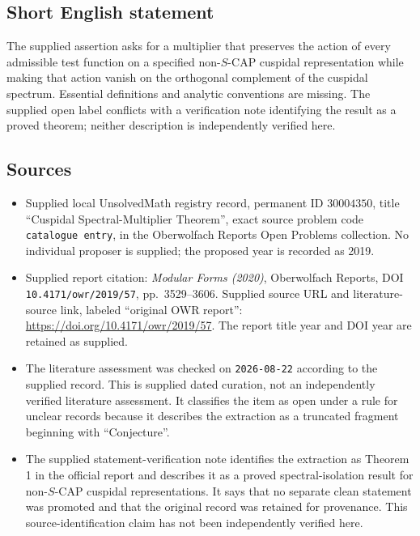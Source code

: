 \documentclass[11pt]{article}
\begin{document}
\subsection{Short English statement}
The supplied assertion asks for a multiplier that preserves the action of every admissible test function on a specified non-\(S\)-CAP cuspidal representation while making that action vanish on the orthogonal complement of the cuspidal spectrum. Essential definitions and analytic conventions are missing. The supplied open label conflicts with a verification note identifying the result as a proved theorem; neither description is independently verified here.
\subsection{Sources}
\begin{itemize}
\item Supplied local UnsolvedMath registry record, permanent ID \(30004350\), title ``Cuspidal Spectral-Multiplier Theorem'', exact source problem code \texttt{catalogue entry}, in the Oberwolfach Reports Open Problems collection. No individual proposer is supplied; the proposed year is recorded as 2019.
\item Supplied report citation: \emph{Modular Forms (2020)}, Oberwolfach Reports, DOI \texttt{10.4171/owr/2019/57}, pp.\ 3529--3606. Supplied source URL and literature-source link, labeled ``original OWR report'': \url{https://doi.org/10.4171/owr/2019/57}. The report title year and DOI year are retained as supplied.
\item The literature assessment was checked on \texttt{2026-08-22} according to the supplied record. This is supplied dated curation, not an independently verified literature assessment. It classifies the item as open under a rule for unclear records because it describes the extraction as a truncated fragment beginning with ``Conjecture''.
\item The supplied statement-verification note identifies the extraction as Theorem 1 in the official report and describes it as a proved spectral-isolation result for non-\(S\)-CAP cuspidal representations. It says that no separate clean statement was promoted and that the original record was retained for provenance. This source-identification claim has not been independently verified here.
\end{itemize}
\end{document}
